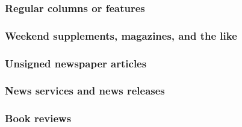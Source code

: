 \documentclass[11pt,letterpaper,oneside]{article}
\begin{document}
\setcounter{subsubsection}{194}
\subsubsection{Regular columns or features}

\begin{citebib}
\item \cite{jaffe2015}
\end{citebib}

\setcounter{subsubsection}{196}
\subsubsection{Weekend supplements, magazines, and the like}

\begin{citebib}
\item \cite[48]{ghansah2015}
\end{citebib}

\setcounter{subsubsection}{198}
\subsubsection{Unsigned newspaper articles}

\begin{citebib}
\item \cite{nytimes2002}
\end{citebib}

\subsubsection{News services and news releases}

\begin{citebib}
\item \cite{ap2015}
\end{citebib}

\setcounter{subsubsection}{201}
\subsubsection{Book reviews}

\begin{citebib}
\item \cite[B13--B14]{ratliff1999}
\item \cite{brehm2015}
\end{citebib}
\end{document}
